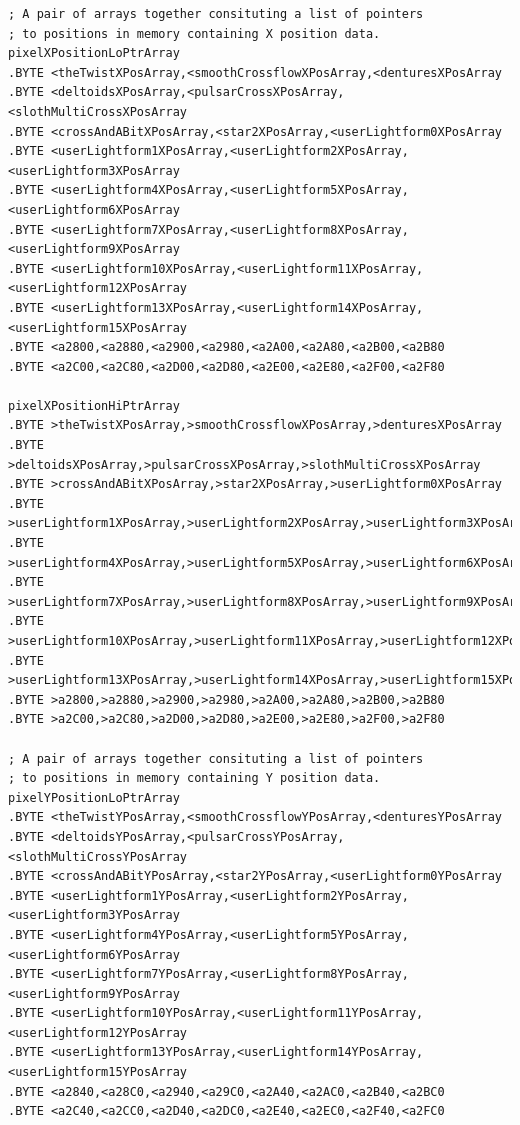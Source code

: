 \begin{lstlisting}[basicstyle=\ttfamily\scriptsize,caption = All the pattern data structures in Colourspace organized into a set of arrays. 
We use these arrays to choose the correct user-selected pattern at painting time.]
; A pair of arrays together consituting a list of pointers
; to positions in memory containing X position data.
pixelXPositionLoPtrArray   
.BYTE <theTwistXPosArray,<smoothCrossflowXPosArray,<denturesXPosArray
.BYTE <deltoidsXPosArray,<pulsarCrossXPosArray,<slothMultiCrossXPosArray
.BYTE <crossAndABitXPosArray,<star2XPosArray,<userLightform0XPosArray
.BYTE <userLightform1XPosArray,<userLightform2XPosArray,<userLightform3XPosArray
.BYTE <userLightform4XPosArray,<userLightform5XPosArray,<userLightform6XPosArray
.BYTE <userLightform7XPosArray,<userLightform8XPosArray,<userLightform9XPosArray
.BYTE <userLightform10XPosArray,<userLightform11XPosArray,<userLightform12XPosArray
.BYTE <userLightform13XPosArray,<userLightform14XPosArray,<userLightform15XPosArray
.BYTE <a2800,<a2880,<a2900,<a2980,<a2A00,<a2A80,<a2B00,<a2B80
.BYTE <a2C00,<a2C80,<a2D00,<a2D80,<a2E00,<a2E80,<a2F00,<a2F80

pixelXPositionHiPtrArray   
.BYTE >theTwistXPosArray,>smoothCrossflowXPosArray,>denturesXPosArray
.BYTE >deltoidsXPosArray,>pulsarCrossXPosArray,>slothMultiCrossXPosArray
.BYTE >crossAndABitXPosArray,>star2XPosArray,>userLightform0XPosArray
.BYTE >userLightform1XPosArray,>userLightform2XPosArray,>userLightform3XPosArray
.BYTE >userLightform4XPosArray,>userLightform5XPosArray,>userLightform6XPosArray
.BYTE >userLightform7XPosArray,>userLightform8XPosArray,>userLightform9XPosArray
.BYTE >userLightform10XPosArray,>userLightform11XPosArray,>userLightform12XPosArray
.BYTE >userLightform13XPosArray,>userLightform14XPosArray,>userLightform15XPosArray
.BYTE >a2800,>a2880,>a2900,>a2980,>a2A00,>a2A80,>a2B00,>a2B80
.BYTE >a2C00,>a2C80,>a2D00,>a2D80,>a2E00,>a2E80,>a2F00,>a2F80

; A pair of arrays together consituting a list of pointers
; to positions in memory containing Y position data.
pixelYPositionLoPtrArray   
.BYTE <theTwistYPosArray,<smoothCrossflowYPosArray,<denturesYPosArray
.BYTE <deltoidsYPosArray,<pulsarCrossYPosArray,<slothMultiCrossYPosArray
.BYTE <crossAndABitYPosArray,<star2YPosArray,<userLightform0YPosArray
.BYTE <userLightform1YPosArray,<userLightform2YPosArray,<userLightform3YPosArray
.BYTE <userLightform4YPosArray,<userLightform5YPosArray,<userLightform6YPosArray
.BYTE <userLightform7YPosArray,<userLightform8YPosArray,<userLightform9YPosArray
.BYTE <userLightform10YPosArray,<userLightform11YPosArray,<userLightform12YPosArray
.BYTE <userLightform13YPosArray,<userLightform14YPosArray,<userLightform15YPosArray
.BYTE <a2840,<a28C0,<a2940,<a29C0,<a2A40,<a2AC0,<a2B40,<a2BC0
.BYTE <a2C40,<a2CC0,<a2D40,<a2DC0,<a2E40,<a2EC0,<a2F40,<a2FC0


\end{lstlisting}
